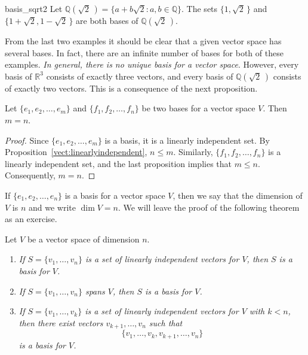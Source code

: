  
 
\begin{example}{basis_sqrt2}
Let ${\mathbb Q}( \sqrt{2}\, ) = \{ a + b \sqrt{2} : a, b \in {\mathbb Q} \}$.
The sets $\{1, \sqrt{2}\,  \}$ and $\{1+\sqrt{2}, 1- \sqrt{2}\,  \}$ are
both bases of ${\mathbb Q}( \sqrt{2}\, )$.  
\end{example}





From the last two examples it should be clear that a given vector
space has several bases. In fact, there are an infinite number of
bases for both of these examples. {\em In general, there is no unique 
basis for a vector space}.  However, every basis of ${\mathbb R}^3$ consists
of exactly three vectors, and every  basis of ${\mathbb Q}(\sqrt{2}\, )$ 
consists of exactly two vectors. This is a consequence of the next 
proposition.


\begin{proposition}
Let $\{ e_1, e_2, \ldots, e_m \}$ and $\{ f_1, f_2, \ldots, f_n \}$ be
two bases for a vector space $V$. Then $m=n$. 
\end{proposition}


\begin{proof}
Since $\{ e_1, e_2, \ldots, e_m \}$ is a basis, it is a linearly
independent set.  By  Proposition~\ref{vect:linearlyindependent}, $n \leq m$. Similarly, $\{
f_1, f_2, \ldots, f_n \}$ is a linearly independent set, and the last
proposition implies that $m \leq n$.  Consequently, $m =n$.
\mbox{\hspace{1in}}
\end{proof}
 

\medskip
 

If $\{ e_1, e_2, \ldots, e_n \}$ is a basis for a vector space $V$,
then we say that the {\bfi dimension\/}
of $V$ is $n$ and we write $\dim V =n$\label{vectdim}. 
We will leave the proof of the following theorem as an exercise.


\begin{theorem}
Let $V$ be a vector space of dimension $n$.
\begin{enumerate}

\rm \item \it
If $S = \{v_1, \ldots, v_n \}$ is a set of linearly independent
vectors for $V$, then $S$ is a basis for $V$. 

\rm \item \it
If $S = \{v_1, \ldots, v_n \}$ spans $V$, then $S$ is a basis for $V$. 

\rm \item \it
If $S = \{v_1, \ldots, v_k \}$ is a set of linearly independent
vectors for $V$ with $k < n$, then there exist vectors $v_{k+1},
\ldots, v_n$ such that  
\[
\{v_1, \ldots, v_k, v_{k+1}, \ldots, v_n \}
\] 
is a basis for $V$. 

\end{enumerate}
\end{theorem}


